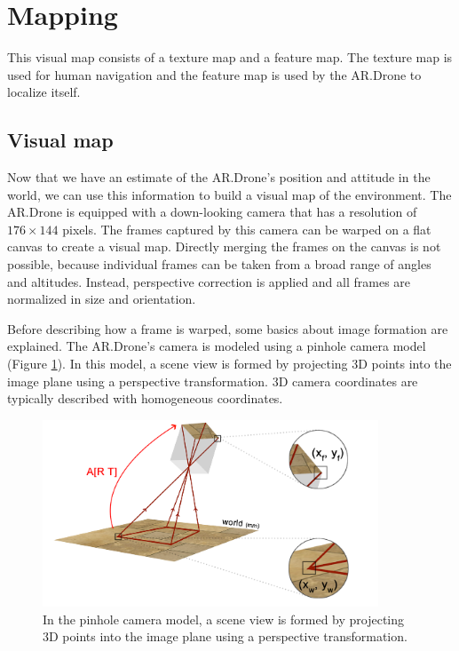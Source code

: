 	\section{Mapping}
	\label{sec:mapping}
This visual map consists of a texture map and a feature map. The texture map is used for human navigation and the feature map is used by the AR.Drone to localize itself.

	\subsection{Visual map}
Now that we have an estimate of the AR.Drone's position and attitude in the world, we can use this information to build a visual map of the environment.
The AR.Drone is equipped with a down-looking camera that has a resolution of $176 \times 144$ pixels.
The frames captured by this camera can be warped on a flat canvas to create a visual map.
Directly merging the frames on the canvas is not possible, because individual frames can be taken from a broad range of angles and altitudes.
Instead, perspective correction is applied and all frames are normalized in size and orientation.

Before describing how a frame is warped, some basics about image formation are explained. %
The AR.Drone's camera is modeled using a pinhole camera model (Figure \ref{fig:mapping1}).
In this model, a scene view is formed by projecting 3D points into the image plane using a perspective transformation.
3D camera coordinates are typically described with homogeneous coordinates.

\begin{figure}[htb]
\centering
\includegraphics[width=10cm]{images/mapping0.png}
\caption{In the pinhole camera model, a scene view is formed by projecting 3D points into the image plane using a perspective transformation.}
\label{fig:mapping1}
\end{figure}

